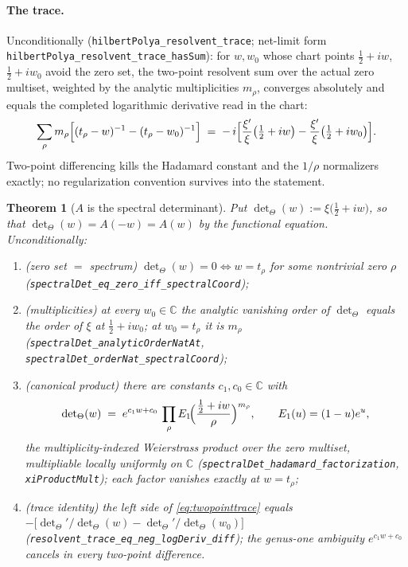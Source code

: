 \documentclass[11pt]{article}
\theoremstyle{plain}
\newtheorem{theorem}{Theorem}
\theoremstyle{definition}
\theoremstyle{remark}
\newcommand{\C}{\mathbb{C}}
\begin{document}
\paragraph{The trace.}
Unconditionally (\texttt{hilbertPolya\_resolvent\_trace}; net-limit form
\texttt{hilbertPolya\_resolvent\_trace\_hasSum}): for $w,w_0$ whose chart
points $\tfrac12+iw$, $\tfrac12+iw_0$ avoid the zero set, the two-point
resolvent sum over the actual zero multiset, weighted by the analytic
multiplicities $m_\rho$, converges absolutely and equals the completed
logarithmic derivative read in the chart:
\begin{equation}\label{eq:twopointtrace}
  \sum_{\rho} m_\rho\Bigl[(t_\rho-w)^{-1}-(t_\rho-w_0)^{-1}\Bigr]
  \;=\;
  -\,i\Bigl[\frac{\xi'}{\xi}\bigl(\tfrac12+iw\bigr)
        -\frac{\xi'}{\xi}\bigl(\tfrac12+iw_0\bigr)\Bigr].
\end{equation}
Two-point differencing kills the Hadamard constant and the $1/\rho$
normalizers exactly; no regularization convention survives into the
statement.

\begin{theorem}[$A$ is the spectral determinant]\label{thm:specdet}
Put $\det\nolimits_\Theta(w):=\xi\bigl(\tfrac12+iw\bigr)$, so that
$\det\nolimits_\Theta(w)=A(-w)=A(w)$ by the functional equation.
Unconditionally:
\begin{enumerate}
\item[(i)] \emph{(zero set $=$ spectrum)}\;
$\det\nolimits_\Theta(w)=0\iff w=t_\rho$ for some nontrivial zero $\rho$
(\texttt{spectralDet\_eq\_zero\_iff\_spectralCoord});
\item[(ii)] \emph{(multiplicities)}\; at every $w_0\in\C$ the analytic
vanishing order of $\det\nolimits_\Theta$ equals the order of $\xi$ at
$\tfrac12+iw_0$; at $w_0=t_\rho$ it is $m_\rho$
(\texttt{spectralDet\_analyticOrderNatAt},
\texttt{spectralDet\_orderNat\_spectralCoord});
\item[(iii)] \emph{(canonical product)}\; there are constants $c_1,c_0\in\C$
with
\[
  \det\nolimits_\Theta(w)
  \;=\; e^{c_1w+c_0}\,
  \prod_{\rho} E_1\!\Bigl(\frac{\tfrac12+iw}{\rho}\Bigr)^{m_\rho},
  \qquad E_1(u)=(1-u)e^{u},
\]
the multiplicity-indexed Weierstrass product over the zero multiset,
multipliable locally uniformly on $\C$
(\texttt{spectralDet\_hadamard\_factorization}, \texttt{xiProductMult});
each factor vanishes exactly at $w=t_\rho$;
\item[(iv)] \emph{(trace identity)}\; the left side of
\eqref{eq:twopointtrace} equals
$-\bigl[\det\nolimits_\Theta'/\det\nolimits_\Theta(w)
       -\det\nolimits_\Theta'/\det\nolimits_\Theta(w_0)\bigr]$
(\texttt{resolvent\_trace\_eq\_neg\_logDeriv\_diff}); the genus-one ambiguity
$e^{c_1w+c_0}$ cancels in every two-point difference.
\end{enumerate}
\end{theorem}
\end{document}
